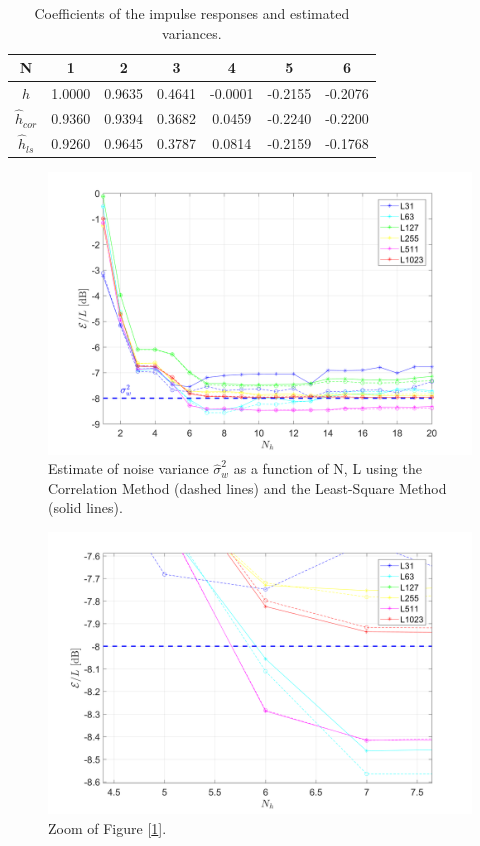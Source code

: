 \documentclass[a4paper, 12pt]{report}
\begin{document}
\begin{table}[H]
	\centering
	\begin{tabular}{c|c|c|c|c|c|c}
		\toprule
		\textbf{N} & 1 & 2 & 3 & 4 & 5 & 6 \\
		\midrule
		\textbf{$h$} & 1.0000  &  0.9635 &   0.4641 &  -0.0001  & -0.2155 &  -0.2076\\
		\midrule
		\textbf{$\hat{h}_{cor}$} & 0.9360 &   0.9394  &  0.3682 &   0.0459 &  -0.2240 &  -0.2200\\
		\midrule
		\textbf{$\hat{h}_{ls}$} & 0.9260 &   0.9645  &  0.3787  &  0.0814  & -0.2159   &-0.1768\\
		\bottomrule			
	\end{tabular}
	\caption{Coefficients of the impulse responses and estimated variances.}
	\label{ccc}
\end{table}

\begin{figure}[H]
	\centering
	\includegraphics[width=16cm]{images/Ex1_plot1}
	\caption{Estimate of noise variance $\hat{\sigma}_w^2$ as a function of N, L using the Correlation Method (dashed lines) and the Least-Square Method (solid lines).}\label{Ex1_plot1}
\end{figure}

\begin{figure}[H]
	\centering
	\includegraphics[width=16cm]{images/Ex1_plot2}
	\caption{Zoom of Figure [\ref{Ex1_plot1}].}\label{Ex1_plot2}
\end{figure}
\end{document}

